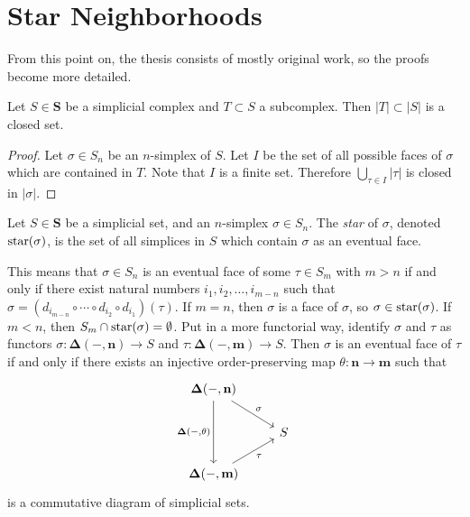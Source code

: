 \section{Star Neighborhoods}

From this point on, the thesis consists of mostly original work, so the proofs become more detailed.

\begin{lemma}
\label{lem:subcomplex is closed subset in the realization}
Let $S \in \mathbf{S}$ be a simplicial complex and $T \subset S$ a subcomplex. Then $|T| \subset |S|$ is a closed set.
\end{lemma}
\begin{proof}
Let $\sigma \in S_n$ be an $n$-simplex of $S$. Let $I$ be the set of all possible faces of $\sigma$ which are contained in $T$. Note that $I$ is a finite set. Therefore $\bigcup_{\tau \in I}|\tau|$ is closed in $|\sigma|$.
\end{proof}

\begin{definition}
\label{def:star of a simplex}
Let $S \in \mathbf{S}$ be a simplicial set, and an $n$-simplex $\sigma \in S_n$. The \emph{star} of $\sigma$, denoted $\operatorname{star}(\sigma)$, is the set of all simplices in $S$ which contain $\sigma$ as an eventual face.
\end{definition}

This means that $\sigma \in S_n$ is an eventual face of some $\tau \in S_m$ with $m>n$ if and only if there exist natural numbers $i_1,i_2,\ldots,i_{m-n}$ such that $\sigma = (d_{i_{m-n}} \circ \cdots \circ d_{i_{2}} \circ d_{i_{1}})(\tau)$. If $m=n$, then $\sigma$ is a face of $\sigma$, so $\sigma \in \operatorname{star}(\sigma)$. If $m < n$, then $S_m \cap \operatorname{star}(\sigma) = \emptyset$. Put in a more functorial way, identify $\sigma$ and $\tau$ as functors $\sigma : \mathbf{\Delta}(-,\mathbf{n}) \to S$ and $\tau : \mathbf{\Delta}(-,\mathbf{m}) \to S$. Then $\sigma$ is an eventual face of $\tau$ if and only if there exists an injective order-preserving map $\theta : \mathbf{n} \to \mathbf{m}$ such that
\begin{equation}
\label{eq:sigma is eventual face of tau diagram}
\begin{tikzcd}
\mathbf{\Delta}(-,\mathbf{n}) \arrow{dr}{\sigma} \arrow[swap]{dd}{\mathbf{\Delta}(-,\theta)} & \\
& S \\
\mathbf{\Delta}(-,\mathbf{m}) \arrow[swap]{ur}{\tau}
\end{tikzcd}
\end{equation}
is a commutative diagram of simplicial sets.

